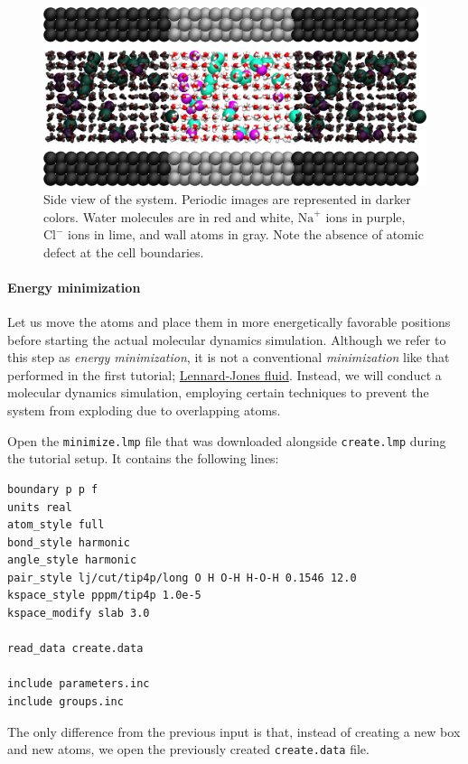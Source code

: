 \documentclass[9pt,tutorial]{livecoms}
\newcommand{\flecmd}[1]{\textcolor{command}{\texttt{#1}}} %
\begin{document}
\begin{figure}
\centering
\includegraphics[width=\linewidth]{NANOSHEAR-system}
\caption{Side view of the system.  Periodic images are represented in darker colors.
Water molecules are in red and white, $\text{Na}^+$ ions in purple, $\text{Cl}^-$
ions in lime, and wall atoms in gray.  Note the absence of atomic defect at the
cell boundaries.}
\label{fig:NANOSHEAR-system}
\end{figure}

\paragraph{Energy minimization}

Let us move the atoms and place them in more energetically favorable positions
before starting the actual molecular dynamics simulation.  Although we refer to this step as
\emph{energy minimization}, it is not a conventional \emph{minimization}
like that performed in the first tutorial; \hyperref[lennard-jones-label]{Lennard-Jones fluid}.
Instead, we will conduct a molecular dynamics simulation, employing certain techniques
to prevent the system from exploding due to overlapping atoms.

Open the \flecmd{minimize.lmp} file that was downloaded alongside
\flecmd{create.lmp} during the tutorial setup.  It contains the following lines:
\begin{lstlisting}
boundary p p f
units real
atom_style full
bond_style harmonic
angle_style harmonic
pair_style lj/cut/tip4p/long O H O-H H-O-H 0.1546 12.0
kspace_style pppm/tip4p 1.0e-5
kspace_modify slab 3.0

read_data create.data

include parameters.inc
include groups.inc
\end{lstlisting}
The only difference from the previous input is that, instead of creating a new
box and new atoms, we open the previously created \flecmd{create.data} file.
\end{document}
